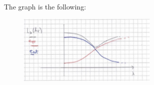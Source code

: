 \documentclass[a4paper,11pt,oneside]{book}
\begin{document}
\begin{enumerate}
\begin{solution}
        The graph is the following:
        
        \begin{figure}[H]
            \centering
            \includegraphics[width=0.6\textwidth,height=0.6\textheight,keepaspectratio]{images/2_3_6_Jul_2021.png}
         \end{figure}
    \end{solution}
\end{enumerate}
\end{document}
